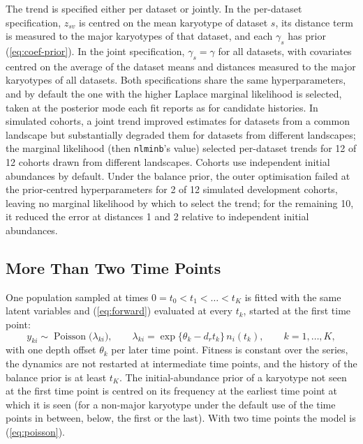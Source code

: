 \documentclass[11pt]{article}
\begin{document}
The trend is specified either per dataset or jointly. In the per-dataset
specification, $z_{sv}$ is centred on the mean karyotype of dataset $s$, its
distance term is measured to the major karyotypes of that dataset, and each
$\gamma_s$ has prior (\ref{eq:coef-prior}). In the joint specification,
$\gamma_s=\gamma$ for all datasets, with covariates centred on the average of
the dataset means and distances measured to the major karyotypes of all
datasets. Both specifications share the same hyperparameters, and by default
the one with the higher Laplace marginal likelihood is selected, taken at the
posterior mode each fit reports as for candidate histories. In simulated
cohorts, a joint trend improved estimates for datasets from a common landscape
but substantially degraded them for datasets from different landscapes; the
marginal likelihood (then \texttt{nlminb}'s value) selected per-dataset trends
for 12 of 12 cohorts drawn from different landscapes. Cohorts use independent initial abundances by
default. Under the balance prior, the outer optimisation failed at the
prior-centred hyperparameters for 2 of 12 simulated development cohorts,
leaving no marginal likelihood by which to select the trend; for the
remaining 10, it reduced the error at distances 1 and 2 relative to
independent initial abundances.

\subsection{More Than Two Time Points}
\label{sec:sj-series}

One population sampled at times $0=t_0<t_1<\dots<t_K$ is fitted with the same
latent variables and (\ref{eq:forward}) evaluated at every $t_k$, started at
the first time point:
\begin{equation}
  y_{ki}\sim\operatorname{Poisson}\bigl(\lambda_{ki}\bigr),
  \qquad
  \lambda_{ki}=\exp\bigl\{\theta_k-d_rt_k\bigr\}\,n_i(t_k),
  \qquad k=1,\dots,K,
  \label{eq:series}
\end{equation}
with one depth offset $\theta_k$ per later time point. Fitness is constant over
the series, the dynamics are not restarted at intermediate time points, and the
history of the balance prior is at least $t_K$. The initial-abundance prior of
a karyotype not seen at the first time point is centred on its frequency at the
earliest time point at which it is seen (for a non-major karyotype under the
default use of the time points in between, below, the first or the last). With
two time points the model is
(\ref{eq:poisson}).
\end{document}
